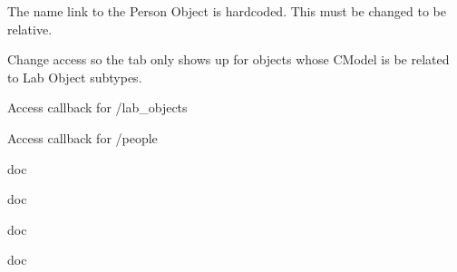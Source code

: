 
\begin{DoxyRefList}
\item[\label{todo__todo000004}%
\hypertarget{todo__todo000004}{}%
Member \hyperlink{islandora__bioinformatics__base_8module_a833d478f4f75aec1a655731d56a9524d}{islandora\+\_\+bioinformatics\+\_\+base\+\_\+form\+\_\+related\+\_\+people\+\_\+form\+\_\+alter} (\&\$form, \&\$form\+\_\+state)]The name link to the Person Object is hardcoded. This must be changed to be relative.  
\item[\label{todo__todo000001}%
\hypertarget{todo__todo000001}{}%
Member \hyperlink{islandora__bioinformatics__base_8module_a34856467f23719cd8eaf851f85ccf7e8}{islandora\+\_\+bioinformatics\+\_\+base\+\_\+menu} ()]Change access so the tab only shows up for objects whose C\+Model is be related to Lab Object subtypes. 

Access callback for /lab\+\_\+objects 

Access callback for /people  
\item[\label{todo__todo000005}%
\hypertarget{todo__todo000005}{}%
Member \hyperlink{islandora__bioinformatics__base_8module_a1dc5e940beb7a2b30952ce00b01d388e}{related\+\_\+islandora\+\_\+objects} (\$object, \$cmodels=null, \$relationships=null)]doc

doc

doc

doc 
\end{DoxyRefList}
